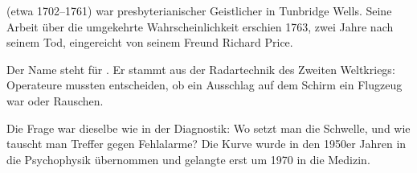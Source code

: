 \begin{geschichte}
 (etwa 1702--1761) war presbyterianischer Geistlicher in Tunbridge Wells. Seine Arbeit über die umgekehrte Wahrscheinlichkeit erschien 1763, zwei Jahre nach seinem Tod, eingereicht von seinem Freund Richard Price.

\begin{center}
\begin{minipage}{0.9\textwidth}
\end{minipage}
\end{center}

Der Name steht für . Er stammt aus der Radartechnik des Zweiten Weltkriegs: Operateure mussten entscheiden, ob ein Ausschlag auf dem Schirm ein Flugzeug war oder Rauschen.

Die Frage war dieselbe wie in der Diagnostik: Wo setzt man die Schwelle, und wie tauscht man Treffer gegen Fehlalarme? Die Kurve wurde in den 1950er Jahren in die Psychophysik übernommen und gelangte erst um 1970 in die Medizin.

\begin{center}
\begin{minipage}{0.9\textwidth}
\end{minipage}
\end{center}
\end{geschichte}

